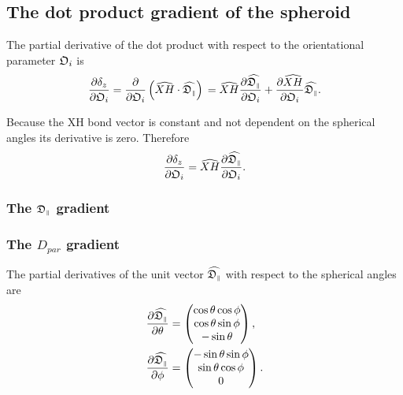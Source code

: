 
\subsection{The dot product gradient of the spheroid}

The partial derivative of the dot product with respect to the orientational parameter $\mathfrak{O}_i$ is
\begin{equation}
    \frac{\partial \delta_z}{\partial \mathfrak{O}_i}
        = \frac{\partial}{\partial \mathfrak{O}_i} \left( \widehat{XH} \cdot \widehat{\mathfrak{D}_{\scriptscriptstyle \parallel}} \right) \\
        = \widehat{XH} \frac{\partial \widehat{\mathfrak{D}_{\scriptscriptstyle \parallel}}}{\partial \mathfrak{O}_i}  +  \frac{\partial \widehat{XH}}{\partial \mathfrak{O}_i} \widehat{\mathfrak{D}_{\scriptscriptstyle \parallel}}.
\end{equation}

\noindent Because the XH bond vector is constant and not dependent on the spherical angles its derivative is zero.
Therefore
\begin{equation}
    \frac{\partial \delta_z}{\partial \mathfrak{O}_i} = \widehat{XH} \frac{\partial \widehat{\mathfrak{D}_{\scriptscriptstyle \parallel}}}{\partial \mathfrak{O}_i}.
\end{equation}



\begin{latexonly}
    \subsubsection{The $\mathfrak{D}_{\scriptscriptstyle \parallel}$ gradient}
\end{latexonly}
\begin{htmlonly}
    \subsubsection{The $D_{par}$ gradient}
\end{htmlonly}

The partial derivatives of the unit vector $\widehat{\mathfrak{D}_{\scriptscriptstyle \parallel}}$ with respect to the spherical angles are
\begin{subequations}
\begin{align}
    \frac{\partial \widehat{\mathfrak{D}_{\scriptscriptstyle \parallel}}}{\partial \theta} &= \begin{pmatrix}
        \cos \theta \cos \phi \\
        \cos \theta \sin \phi \\
        -\sin \theta \\
    \end{pmatrix}, \\
    \frac{\partial \widehat{\mathfrak{D}_{\scriptscriptstyle \parallel}}}{\partial \phi} &= \begin{pmatrix}
        -\sin \theta \sin \phi \\
        \sin \theta \cos \phi \\
        0 \\
    \end{pmatrix}.
\end{align}
\end{subequations}



